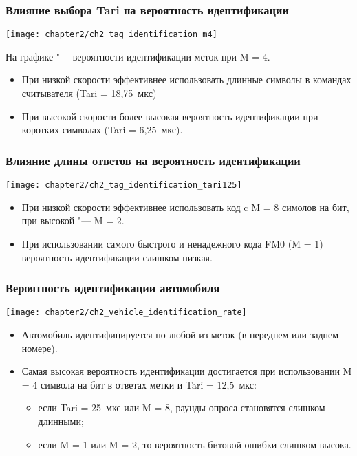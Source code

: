 \begin{frame}
    \frametitle{Влияние выбора Tari на вероятность идентификации}
    \begin{center}
        \texttt{[image: chapter2/ch2\_tag\_identification\_m4]}
    \end{center}
    На графике "--- вероятности идентификации меток при M = 4.
    \begin{itemize}
    \item При низкой скорости эффективнее использовать длинные символы в командах считывателя (Tari = 18,75~мкс)
    \item При высокой скорости более высокая вероятность идентификации при коротких символах (Tari = 6,25~мкс).
    \end{itemize}
\end{frame}

\begin{frame}
    \frametitle{Влияние длины ответов на вероятность идентификации}
    \begin{center}
        \texttt{[image: chapter2/ch2\_tag\_identification\_tari125]}
    \end{center}
    \begin{itemize}
        \item При низкой скорости эффективнее использовать код c M = 8 симолов на бит, при высокой "--- M = 2.
        \item При использовании самого быстрого и ненадежного кода FM0 (M = 1) вероятность идентификации слишком низкая.
    \end{itemize}
\end{frame}

\begin{frame}
    \frametitle{Вероятность идентификации автомобиля}
    \begin{center}
        \texttt{[image: chapter2/ch2\_vehicle\_identification\_rate]}
    \end{center}
    \begin{itemize}
        \item Автомобиль идентифицируется по любой из меток (в переднем или заднем номере).
        \item Самая высокая вероятность идентификации достигается при использовании M = 4 символа на бит в ответах метки и Tari = 12,5~мкс:
        \begin{itemize}
            \item если Tari = 25~мкс или M = 8, раунды опроса становятся слишком длинными;
            \item если M = 1 или M = 2, то вероятность битовой ошибки слишком высока.
        \end{itemize}
    \end{itemize}

\end{frame}

